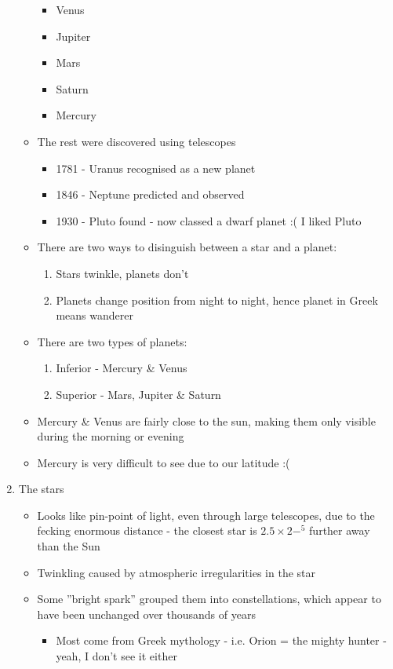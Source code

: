 \documentclass[a4paper, 11pt]{article}
\begin{document}
\begin{enumerate}
\begin{itemize}
\begin{itemize}
		\item Venus
		\item Jupiter
		\item Mars
		\item Saturn
		\item Mercury
		\end{itemize}
	\item The rest were discovered using telescopes
		\begin{itemize}
		\item 1781 - Uranus recognised as a new planet
		\item 1846 - Neptune predicted and observed
		\item 1930 - Pluto found - now classed a dwarf planet :( I liked Pluto
		\end{itemize}
	\item There are two ways to disinguish between a star and a planet:
		\begin{enumerate}
		\item Stars twinkle, planets don't
		\item Planets change position from night to night, hence planet in Greek means wanderer
		\end{enumerate}
	\item There are two types of planets:
		\begin{enumerate}
		\item Inferior - Mercury \& Venus
		\item Superior - Mars, Jupiter \& Saturn
		\end{enumerate}
	\item Mercury \& Venus are fairly close to the sun, making them only visible during the morning or evening
	\item Mercury is very difficult to see due to our latitude :(
	\end{itemize}
\item The stars
	\begin{itemize}
	\item Looks like pin-point of light, even through large telescopes, due to the fecking enormous distance - the closest star is \(2.5\times2-^5\) further away than the Sun
	\item Twinkling caused by atmospheric irregularities in the star
	\item Some ''bright spark'' grouped them into constellations, which appear to have been unchanged over thousands of years
		\begin{itemize}
		\item Most come from Greek mythology - i.e. Orion = the mighty hunter - yeah, I don't see it either

\end{itemize}
\end{itemize}
\end{enumerate}
\end{document}
